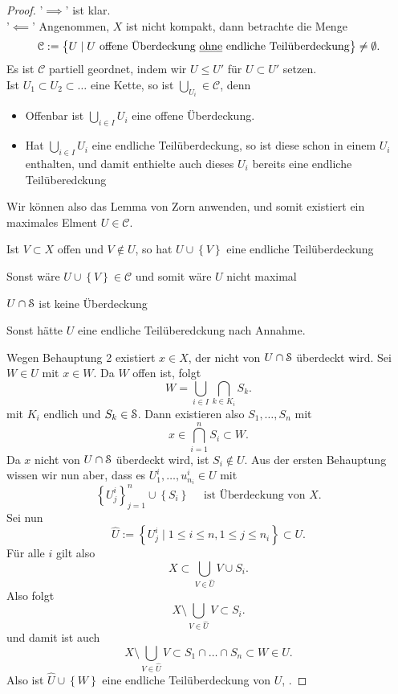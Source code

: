 \begin{proof}
    '$\implies$' ist klar. \\
    '$\impliedby$' Angenommen, $X$ ist nicht kompakt, dann betrachte die Menge
     \[
    \mathcal{C} := \left \{U \mid  U \text{ offene Überdeckung \underline{ohne} endliche Teilüberdeckung}\right\} \neq \emptyset
    .\] 
    Es ist $\mathcal{C}$ partiell geordnet, indem wir $U\leq U'$ für $U\subset U'$ setzen. \\
    Ist $U_1\subset U_2\subset \ldots$ eine Kette, so ist $\bigcup_{U_i}\in \mathcal{C}$, denn
    \begin{itemize}
        \item Offenbar ist $\bigcup_{i \in  I} U_i$ eine offene Überdeckung.
        \item Hat $\bigcup_{i \in  I} U_i$ eine endliche Teilüberdeckung, so ist diese schon in einem $U_i$ enthalten, und damit enthielte auch dieses  $U_i$ bereits eine endliche Teilüberedckung \contra
    \end{itemize}
Wir können also das Lemma von Zorn anwenden, und somit existiert ein maximales Elment $U\in \mathcal{C}$.
\begin{claim}
    Ist $V\subset X$ offen und  $V\not\in U$, so hat $U\cup \left \{V\right\} $ eine endliche Teilüberdeckung
\end{claim}
\begin{subproof}
    Sonst wäre $U \cup \left \{V\right\} \in \mathcal{C}$ und somit wäre $U$ nicht maximal
\end{subproof}
\begin{claim}
    $U \cap \mathcal{S}$ ist keine Überdeckung
\end{claim}
\begin{subproof}
    Sonst hätte $U$ eine endliche Teilüberedckung nach Annahme.
\end{subproof}
Wegen Behauptung 2 existiert $x\in X$, der nicht von $U \cap \mathcal{S}$ überdeckt wird. Sei $W\in U$ mit $x\in W$. Da $W$ offen ist, folgt
 \[
W = \bigcup_{i \in  I} \bigcap_{k\in K_i} S_k
.\] 
mit $K_i$ endlich und  $S_k \in \mathcal{S}$. Dann existieren also $S_1,\ldots,S_n$ mit 
\[
x \in  \bigcap_{i=1}^n S_i \subset W 
.\] 
Da $x$ nicht von  $U \cap \mathcal{S}$ überdeckt wird, ist $S_i \not\in U$. Aus der ersten Behauptung wissen wir nun aber, dass es $U_1^i, \ldots, u_{n_i}^i \in U$ mit
\[
\left \{U_j ^i\right\} _{j=1}^n \cup \left \{S_i\right\}  \quad \text{ ist Überdeckung von } X
.\] 
Sei nun 
\[
\hat{U} := \left \{U_j ^i \mid  1\leq i\leq n, 1\leq j\leq n_i\right\} \subset U
.\] 
Für alle $i$ gilt also
 \[
X \subset \bigcup_{V\in \hat{U}} V \cup S_i 
.\] 
Also folgt
\[
X \setminus \bigcup_{V\in \hat{U}} V \subset S_i 
.\] 
und damit ist auch
\[
X\setminus \bigcup_{V\in \hat{U}} V \subset S_1 \cap \ldots \cap S_n \subset W \in U 
.\] 
Also ist $\hat{U}\cup \left \{W\right\} $ eine endliche Teilüberdeckung von $U$, \contra.
\end{proof}
